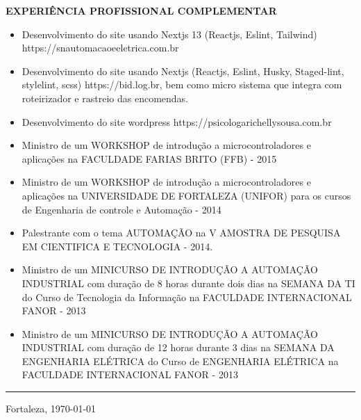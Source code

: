 \documentclass[12pt, a4paper]{article}
\newcommand{\LlinhaG}{2pt} %
\newcommand{\TlinhaG}{17cm}  %
\begin{document}
\begin{center}
	\textbf{EXPERIÊNCIA PROFISSIONAL COMPLEMENTAR}\\
\end{center}
\begin{itemize}
	\item Desenvolvimento do site usando Nextjs 13 (Reactjs, Eslint, Tailwind) https://snautomacaoeeletrica.com.br
	\item Desenvolvimento do site usando Nextjs (Reactjs, Eslint, Husky, Staged-lint, stylelint, scss) https://bid.log.br, bem como micro sistema que integra com roteirizador e rastreio das encomendas.
	\item Desenvolvimento do site wordpress https://psicologarichellysousa.com.br
	\item Ministro de um WORKSHOP  de introdução a microcontroladores e aplicações na FACULDADE FARIAS BRITO (FFB) - 2015
	\item Ministro de um WORKSHOP  de introdução a microcontroladores e aplicações na UNIVERSIDADE DE FORTALEZA (UNIFOR) para os cursos de Engenharia de controle e Automação - 2014
	\item Palestrante com o tema AUTOMAÇÃO  na V AMOSTRA DE PESQUISA EM CIENTIFICA E TECNOLOGIA - 2014.
	\item Ministro de um MINICURSO DE INTRODUÇÃO A AUTOMAÇÃO INDUSTRIAL com duração de 8 horas durante dois dias na SEMANA DA TI do Curso de Tecnologia da Informação na FACULDADE INTERNACIONAL FANOR - 2013
	\item Ministro de um MINICURSO DE INTRODUÇÃO A AUTOMAÇÃO INDUSTRIAL com duração de 12 horas durante 3 dias na SEMANA DA ENGENHARIA ELÉTRICA do Curso de ENGENHARIA ELÉTRICA na FACULDADE INTERNACIONAL FANOR - 2013
\end{itemize}

\begin{center}
	\rule{\TlinhaG}{\LlinhaG}
\end{center}

\vspace{5cm}
\begin{center}
	\noindent Fortaleza, \today  %
\end{center}
\end{document}

